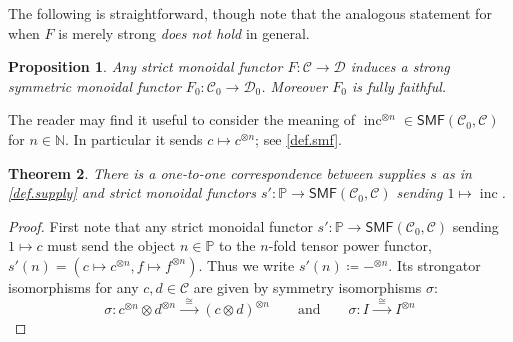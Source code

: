 \documentclass[11pt, oneside, article]{memoir}
\theoremstyle{plain}
\newtheorem{theorem}{Theorem}[chapter]
\newtheorem{proposition}[theorem]{Proposition}
\theoremstyle{definition}
\theoremstyle{remark}
\newcommand{\cat}[1]{\mathcal{#1}}%
\newcommand{\Cat}[1]{{\mathsf{#1}}}%
\DeclareMathOperator{\inc}{inc}
\newcommand{\tpow}[1]{^{\otimes #1}}
\newcommand{\smf}{\Cat{SMF}}
\newcommand{\nn}{\mathbb{N}}
\newcommand{\pp}{\mathbb{P}}
\newcommand{\mob}[1]{#1_0}
\newcommand{\To}[1]{\xrightarrow{#1}}
\newcommand{\Too}[1]{\To{\;\;#1\;\;}}
\newcommand{\qqand}{\qquad\text{and}\qquad}
\begin{document}
The following is straightforward, though note that the analogous statement for when $F$ is merely strong \emph{does not hold} in general.
 
\begin{proposition}\label{prop.strict_f_objects}
Any strict monoidal functor $F\colon\cat{C}\to\cat{D}$ induces a strong symmetric monoidal functor $\mob{F}\colon\mob{\cat{C}}\to\mob{\cat{D}}$. Moreover $\mob{F}$ is fully faithful.
\end{proposition}

The reader may find it useful to consider the meaning of $\inc\tpow{n}\in\smf(\mob{\cat{C}},\cat{C})$ for $n\in\nn$. In particular it sends $c\mapsto c\tpow{n}$; see \cref{def.smf}.

\begin{theorem}\label{thm.supply_v2}
There is a one-to-one correspondence between supplies $s$ as in \cref{def.supply} and strict monoidal functors $s'\colon\pp\to\smf(\mob{\cat{C}},\cat{C})$ sending $1\mapsto\inc$.
\end{theorem}\begin{proof}
First note that any strict monoidal functor $s'\colon\pp\to\smf(\mob{\cat{C}},\cat{C})$ sending $1\mapsto c$ must send the object $n\in\pp$ to the $n$-fold tensor power functor, $s'(n)=(c\mapsto c\tpow{n}, f\mapsto f\tpow{n})$. Thus we write $s'(n)\coloneqq -\tpow{n}$. Its strongator isomorphisms for any $c,d\in\cat{C}$ are given by symmetry isomorphisms $\sigma$:
\begin{equation}\label{eqn.symmetry_c1c2}
  \sigma\colon 
  c\tpow{n}\otimes d\tpow{n}
  \Too{\cong}
  (c\otimes d)\tpow{n}
  \qqand
  \sigma\colon I\Too{\cong}I\tpow{n}
\end{equation}


\end{proof}
\end{document}
